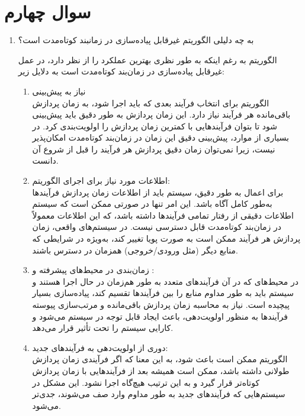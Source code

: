 \section{سوال چهارم}

\begin{enumerate}
	\item 
	به چه دلیلی الگوریتم  غیرقابل پیاده‌سازی در زمانبند کوتاه‌مدت است؟
	\begin{qsolve}
		الگوریتم  به رغم اینکه به طور نظری بهترین عملکرد را از نظر  دارد، در عمل غیرقابل پیاده‌سازی در زمان‌بند کوتاه‌مدت است به دلایل زیر:
		\begin{enumerate}
			\item 
			نیاز به پیش‌بینی \\
			الگوریتم  برای انتخاب فرآیند بعدی که باید اجرا شود، به زمان پردازش باقی‌مانده هر فرآیند نیاز دارد. این زمان پردازش به طور دقیق باید پیش‌بینی شود تا بتوان فرآیندهایی با کمترین زمان پردازش را اولویت‌بندی کرد. در بسیاری از موارد، پیش‌بینی دقیق این زمان در زمان‌بند کوتاه‌مدت امکان‌پذیر نیست، زیرا نمی‌توان زمان دقیق پردازش هر فرآیند را قبل از شروع آن دانست.
			
			\item 
			اطلاعات مورد نیاز برای اجرای الگوریتم:\\
			برای اعمال  به طور دقیق، سیستم باید از اطلاعات زمان پردازش فرآیندها به‌طور کامل آگاه باشد. این امر تنها در صورتی ممکن است که سیستم اطلاعات دقیقی از رفتار تمامی فرآیندها داشته باشد، که این اطلاعات معمولاً در زمان‌بند کوتاه‌مدت قابل دسترسی نیست. در سیستم‌های واقعی، زمان پردازش هر فرآیند ممکن است به صورت پویا تغییر کند، به‌ویژه در شرایطی که منابع دیگر (مثل ورودی/خروجی) همزمان در دسترس باشند.
			
			\item 
			زمان‌بندی در محیط‌های پیشرفته و :\\
			در محیط‌های  که در آن فرآیندهای متعدد به طور هم‌زمان در حال اجرا هستند و سیستم باید به طور مداوم منابع را بین فرآیندها تقسیم کند، پیاده‌سازی  بسیار پیچیده است. نیاز به محاسبه زمان پردازش باقی‌مانده و مرتب‌سازی پیوسته فرآیندها به منظور اولویت‌دهی، باعث ایجاد  قابل توجه در سیستم می‌شود و کارایی سیستم را تحت تأثیر قرار می‌دهد.
			
			\item 
		دوری از اولویت‌دهی به فرآیندهای جدید:\\
		الگوریتم  ممکن است باعث  شود، به این معنا که اگر فرآیندی زمان پردازش طولانی داشته باشد، ممکن است همیشه بعد از فرآیندهایی با زمان پردازش کوتاه‌تر قرار گیرد و به این ترتیب هیچ‌گاه اجرا نشود. این مشکل در سیستم‌هایی که فرآیندهای جدید به طور مداوم وارد صف می‌شوند، جدی‌تر می‌شود.
		\end{enumerate}
	\end{qsolve}
	

\end{enumerate}
